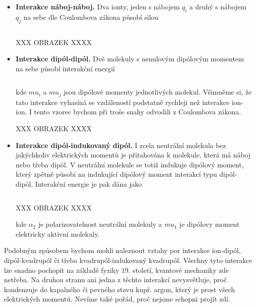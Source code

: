 \begin{itemize} 

\item \textbf{Interakce náboj-náboj.} Dva ionty, jeden s nábojem $q_i$ a druhý s nábojem $q_j$ na sebe dle Coulombova zákona působí silou

\begin{equation}
\label{rov:XXX}
\end{equation}

\bigskip
XXX OBRAZEK XXXX
\bigskip

\item \textbf{Interakce dipól-dipól.} Dvě molekuly s nenulovým dipólovým momentem na sebe působí interakční energií

\begin{equation}
\label{rov:XXX}
\end{equation}

\noindent kde $mu_i$ a $mu_j$ jsou dipólové momenty jednotlivých molekul. Všimněme si, že tato interakce vyhasíná se vzdáleností podstatně rychleji než interakce ion-ion. I tento vzorec bychom při troše snahy odvodili z Coulombova zákona. 

\bigskip
XXX OBRAZEK XXXX
\bigskip

\item \textbf{Interakce dipól-indukovaný dipól.} I zcela neutrální molekula bez jakýchkoliv elektrických momentů je přitahována k molekule, která má náboj nebo třeba dipól. V neutrální molekule se totiž indukuje dipólový moment, který zpětně působí na indukující dipólový moment interakcí typu dipól-dipól. Interakční energie je pak dána jako


\begin{equation}
\label{rov:XXX}
\end{equation}

\bigskip
XXX OBRAZEK XXXX
\bigskip

\noindent kde $\alpha_2$ je polarizovatelnost neutrální molekuly a $mu_1$ je dipólovy moment elektricky aktivní molekuly. 

\end{itemize}

Podobným způsobem bychom mohli naleznout vztahy por interakce ion-dipól, dipól-kvadrupól či třeba kvadrupól-indukovaný kvadrupól. Všechny tyto interakce lze snadno pochopit na základě fyziky 19. století, kvantové mechaniky zde netřeba. Na druhou stranu ani jedna z těchto interakcí nevysvětluje, proč kondenzuje do kapalného či pevného stavu kupř. argon, který je prost všech elektrických momentů. Nevíme také pořád, proč nejsme schopni projít zdí.

